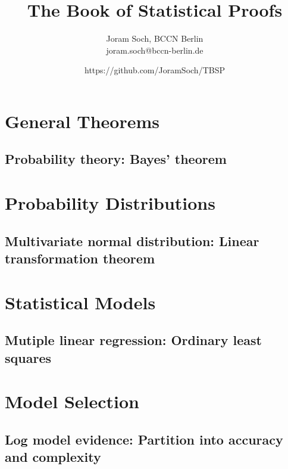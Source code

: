 \documentclass[a4paper,12pt]{book}
\title{The Book of Statistical Proofs}
\author{Joram Soch, BCCN Berlin \\ joram.soch@bccn-berlin.de}
\date{https://github.com/JoramSoch/TBSP}
\begin{document}
\maketitle

\pagebreak
{}
\tableofcontents

\newpage
{}

\chapter{General Theorems}

\newpage
\section{Probability theory: Bayes' theorem}


\chapter{Probability Distributions}

\newpage
\section{Multivariate normal distribution: Linear transformation theorem}


\chapter{Statistical Models}

\newpage
\section{Mutiple linear regression: Ordinary least squares}


\chapter{Model Selection}

\newpage
\section{Log model evidence: Partition into accuracy and complexity}

\end{document}
